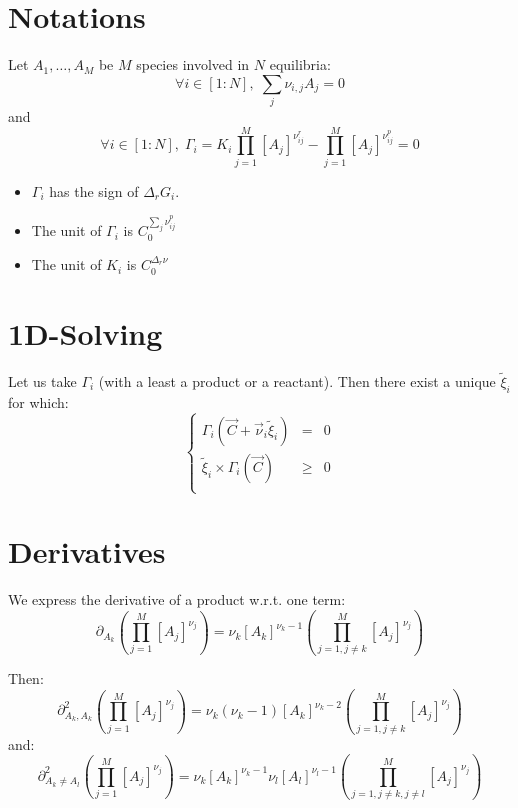 \documentclass[aps,12pt]{revtex4}
\begin{document}
\section{Notations}

Let $A_1,\ldots,A_M$ be $M$ species involved in $N$ equilibria:
\begin{equation}
	\forall i\in[1:N], \; \sum_j \nu_{i,j} A_j = 0
\end{equation}
and
\begin{equation}
	\forall i\in[1:N], \; 
	\Gamma_i = K_i \prod_{j=1}^{M} [A_j]^{\nu^r_{ij}} 
	- \prod_{j=1}^{M} [A_j]^{\nu^p_{ij}} = 0
\end{equation}

\begin{itemize}
\item $\Gamma_i$ has the sign of $\Delta_r G_i$.
\item The unit of $\Gamma_i$ is $C_0^{\sum_j \nu^p_{ij} }$
\item The unit of $K_i$ is $C_0^{\Delta_r \nu}$
\end{itemize}

\section{1D-Solving}
Let us take $\Gamma_i$ (with a least a product or a reactant).
Then there exist a unique $\tilde{\xi}_i$ for which:
\begin{equation}
\left\lbrace
\begin{array}{rcl}
	\Gamma_i(\vec{C} + \vec{\nu}_i \tilde{\xi}_i) & = & 0\\
	 \tilde{\xi}_i \times \Gamma_i(\vec{C}) &\geq  &0\\
\end{array}
\right.
\end{equation}

\section{Derivatives}
We express the derivative of a product w.r.t. one term:
\begin{equation}
	\partial_{A_k} \left( \prod_{j=1}^{M} [A_j]^{\nu_{j}} \right)  =
	\nu_k [A_k]^{\nu_k-1} \left( \prod_{j=1,j\not=k}^{M} [A_j]^{\nu_{j}} \right)
\end{equation}

Then:
\begin{equation}
	\partial^2_{A_k, A_k} \left( \prod_{j=1}^{M} [A_j]^{\nu_{j}} \right)  =
	\nu_k (\nu_k-1) [A_k]^{\nu_k-2} \left( \prod_{j=1,j\not=k}^{M} [A_j]^{\nu_{j}} \right)
\end{equation}
and:
\begin{equation}
	\partial^2_{A_k\not=A_l} \left( \prod_{j=1}^{M} [A_j]^{\nu_{j}} \right)  =
	\nu_k [A_k]^{\nu_k-1} \nu_l [A_l]^{\nu_l-1}\left( \prod_{j=1,j\not=k,j\not=l}^{M} [A_j]^{\nu_{j}} \right)
\end{equation}
\end{document}
